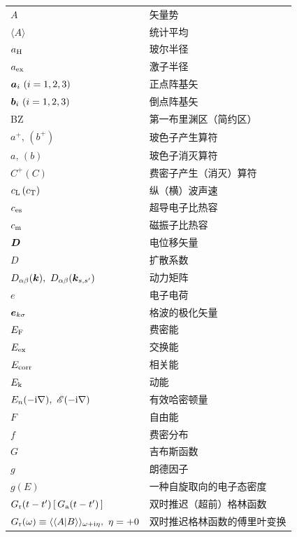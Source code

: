 {\small
\begin{tabular}{@{}p{}@{}p{}@{}}
$A$ & 矢量势 \\
$\langle A\rangle$ & 统计平均 \\
$a_{\rm H}$ & 玻尔半径 \\
$a_{\rm ex}$ & 激子半径 \\
$\ve{a}_i\ (i=1,2,3)$ & 正点阵基矢 \\
$\ve{b}_i\ (i=1,2,3)$ & 倒点阵基矢 \\
BZ & 第一布里渊区（简约区） \\
$a^+,\,(b^+)$ & 玻色子产生算符 \\
$a,\,(b)$ & 玻色子消灭算符 \\
$C^+(C)$ & 费密子产生（消灭）算符 \\
$c_{\rm L}\,(c_{\rm T})$ & 纵（横）波声速 \\
$c_{\rm es}$ & 超导电子比热容 \\
$c_{\rm m}$ & 磁振子比热容 \\
$\bm{D}$ & 电位移矢量 \\
$D$ & 扩散系数 \\
$D_{\alpha\beta}(\ve{k}),\ D_{\alpha\beta}(\ve{k}_{s,s'})$ & 动力矩阵 \\
$e$ & 电子电荷 \\
$\bm{e}_{k\sigma}$ & 格波的极化矢量 \\
$E_{\rm F}$ & 费密能 \\
$E_{\rm ex}$ & 交换能 \\
$E_{\rm corr}$ & 相关能 \\
$E_{\rm k}$ & 动能 \\
$E_n(-{\rm i}\nabla),\ \mathscr{E}(-{\rm i}\nabla)$ & 有效哈密顿量 \\
$F$ & 自由能 \\
$f$ & 费密分布 \\
$G$ & 吉布斯函数 \\
$g$ & 朗德因子 \\
$g(E)$ & 一种自旋取向的电子态密度 \\
$G_{\rm r}(t-t')\,[\,G_{\rm a}(t-t')\,]$ & 双时推迟（超前）格林函数 \\
$G_{\rm r}(\omega)\equiv\langle\langle A|B\rangle\rangle_{\omega+{\rm i}\eta},\ \eta=+0$ & 双时推迟格林函数的傅里叶变换 \\
\end{tabular}
}
\par\bigbreak
